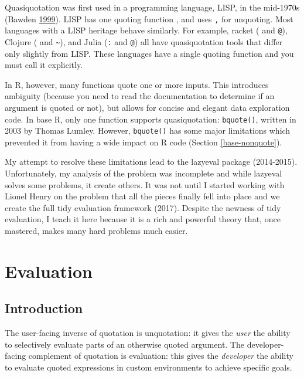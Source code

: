 \documentclass[]{book}
\begin{document}
Quasiquotation was first used in a programming language, LISP, in the mid-1970s (Bawden \protect\hyperlink{ref-bawden-1999}{1999}). LISP has one quoting function \texttt{\textasciigrave{}}, and uses \texttt{,} for unquoting. Most languages with a LISP heritage behave similarly. For example, racket (\texttt{\textasciigrave{}} and \texttt{@}), Clojure (\texttt{\textasciigrave{}} and \texttt{\textasciitilde{}}), and Julia (\texttt{:} and \texttt{@}) all have quasiquotation tools that differ only slightly from LISP. These languages have a single quoting function and you must call it explicitly.

In R, however, many functions quote one or more inputs. This introduces ambiguity (because you need to read the documentation to determine if an argument is quoted or not), but allows for concise and elegant data exploration code. In base R, only one function supports quasiquotation: \texttt{bquote()}, written in 2003 by Thomas Lumley. However, \texttt{bquote()} has some major limitations which prevented it from having a wide impact on R code (Section \ref{base-nonquote}).

My attempt to resolve these limitations lead to the lazyeval package (2014-2015). Unfortunately, my analysis of the problem was incomplete and while lazyeval solves some problems, it create others. It was not until I started working with Lionel Henry on the problem that all the pieces finally fell into place and we create the full tidy evaluation framework (2017). Despite the newness of tidy evaluation, I teach it here because it is a rich and powerful theory that, once mastered, makes many hard problems much easier.

\hypertarget{evaluation}{%
\chapter{Evaluation}\label{evaluation}}

\hypertarget{introduction-4}{%
\section{Introduction}\label{introduction-4}}

The user-facing inverse of quotation is unquotation: it gives the \emph{user} the ability to selectively evaluate parts of an otherwise quoted argument. The developer-facing complement of quotation is evaluation: this gives the \emph{developer} the ability to evaluate quoted expressions in custom environments to achieve specific goals.
\end{document}

